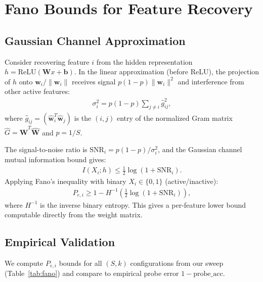 \documentclass[11pt]{article}
\newcommand{\probe}{\mathrm{probe}}
\begin{document}
\section{Fano Bounds for Feature Recovery}

\subsection{Gaussian Channel Approximation}

Consider recovering feature $i$ from the hidden representation $h = \mathrm{ReLU}(\mathbf{W}x + \mathbf{b})$.
In the linear approximation (before ReLU), the projection of $h$ onto $\mathbf{w}_i / \|\mathbf{w}_i\|$
receives signal $p(1-p)\|\mathbf{w}_i\|^2$ and interference from other active features:
\begin{align}
    \sigma_i^2 = p(1-p) \sum_{j \neq i} \hat{g}_{ij}^2,
\end{align}
where $\hat{g}_{ij} = (\hat{\mathbf{w}}_i^T \hat{\mathbf{w}}_j)$ is the $(i,j)$ entry of the
normalized Gram matrix $\hat{G} = \hat{\mathbf{W}}^T \hat{\mathbf{W}}$ and $p = 1/S$.

The signal-to-noise ratio is $\mathrm{SNR}_i = p(1-p) / \sigma_i^2$, and the Gaussian channel
mutual information bound gives:
\begin{align}
    I(X_i; h) \leq \frac{1}{2} \log(1 + \mathrm{SNR}_i).
\end{align}
Applying Fano's inequality with binary $X_i \in \{0, 1\}$ (active/inactive):
\begin{align}
    P_{e,i} \geq 1 - H^{-1}\!\left(\frac{1}{2}\log(1+\mathrm{SNR}_i)\right),
\end{align}
where $H^{-1}$ is the inverse binary entropy. This gives a per-feature lower bound computable
directly from the weight matrix.

\subsection{Empirical Validation}

We compute $P_{e,i}$ bounds for all $(S, k)$ configurations from our sweep
(Table~\ref{tab:fano}) and compare to empirical probe error $1 - \probe\_\mathrm{acc}$.
\end{document}
